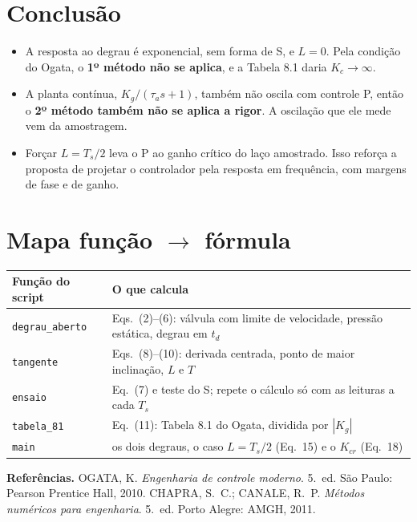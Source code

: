 \documentclass[11pt,a4paper]{article}
\newcommand{\cod}[1]{\texttt{\color{black!75}#1}}
\begin{document}
\section{Conclusão}

\begin{itemize}
  \item A resposta ao degrau é exponencial, sem forma de S, e $L = 0$. Pela condição do Ogata, o
        \textbf{1º método não se aplica}, e a Tabela 8.1 daria $K_c \to \infty$.
  \item A planta contínua, $K_g/(\tau_a s + 1)$, também não oscila com controle P, então o
        \textbf{2º método também não se aplica a rigor}. A oscilação que ele mede vem da amostragem.
  \item Forçar $L = T_s/2$ leva o P ao ganho crítico do laço amostrado. Isso reforça a proposta
        de projetar o controlador pela resposta em frequência, com margens de fase e de ganho.
\end{itemize}

\section*{Mapa função $\to$ fórmula}
\begin{tabular}{ll}
  \toprule
  Função do script & O que calcula \\
  \midrule
  \cod{degrau\_aberto} & Eqs.~(2)--(6): válvula com limite de velocidade, pressão estática, degrau em $t_d$ \\
  \cod{tangente}       & Eqs.~(8)--(10): derivada centrada, ponto de maior inclinação, $L$ e $T$ \\
  \cod{ensaio}         & Eq.~(7) e teste do S; repete o cálculo só com as leituras a cada $T_s$ \\
  \cod{tabela\_81}     & Eq.~(11): Tabela 8.1 do Ogata, dividida por $|K_g|$ \\
  \cod{main}           & os dois degraus, o caso $L = T_s/2$ (Eq.~15) e o $K_{cr}$ (Eq.~18) \\
  \bottomrule
\end{tabular}

\vspace{1em}
\small\textbf{Referências.} OGATA, K. \emph{Engenharia de controle moderno}. 5.~ed. São Paulo:
Pearson Prentice Hall, 2010. CHAPRA, S.~C.; CANALE, R.~P. \emph{Métodos numéricos para engenharia}.
5.~ed. Porto Alegre: AMGH, 2011.
\end{document}
